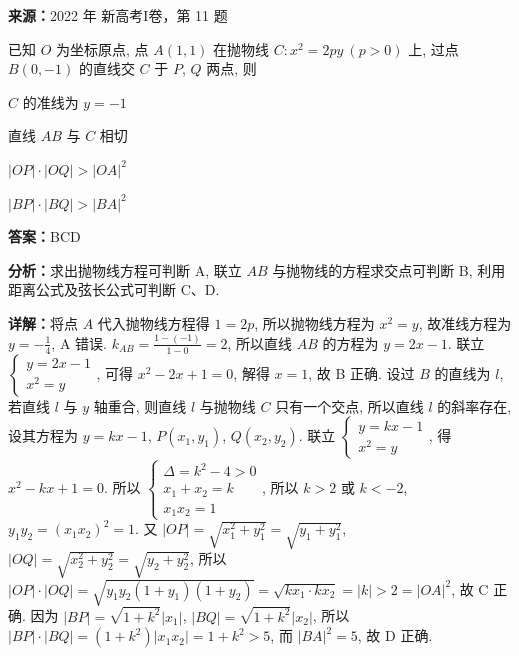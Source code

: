 \begin{question}[points=5]
\textbf{来源：}2022 年 新高考I卷，第 11 题\par
已知 $O$ 为坐标原点, 点 $A(1,1)$ 在抛物线 $C: x^2 = 2py\ (p > 0)$ 上, 过点 $B(0,-1)$ 的直线交 $C$ 于 $P$, $Q$ 两点, 则
\begin{choices}
  \item $C$ 的准线为 $y = -1$
  \item 直线 $AB$ 与 $C$ 相切
  \item $|OP| \cdot |OQ| > |OA|^2$
  \item $|BP| \cdot |BQ| > |BA|^2$
\end{choices}
\begin{solution}
\textbf{答案：}BCD

\textbf{分析：}求出抛物线方程可判断 A, 联立 $AB$ 与抛物线的方程求交点可判断 B, 利用距离公式及弦长公式可判断 C、D.

\textbf{详解：}将点 $A$ 代入抛物线方程得 $1 = 2p$, 所以抛物线方程为 $x^2 = y$, 故准线方程为 $y = -\frac{1}{4}$, A 错误. $k_{AB} = \frac{1 - (-1)}{1 - 0} = 2$, 所以直线 $AB$ 的方程为 $y = 2x - 1$. 联立 $\begin{cases} y = 2x - 1 \\ x^2 = y \end{cases}$, 可得 $x^2 - 2x + 1 = 0$, 解得 $x = 1$, 故 B 正确. 设过 $B$ 的直线为 $l$, 若直线 $l$ 与 $y$ 轴重合, 则直线 $l$ 与抛物线 $C$ 只有一个交点, 所以直线 $l$ 的斜率存在, 设其方程为 $y = kx - 1$, $P(x_1, y_1)$, $Q(x_2, y_2)$. 联立 $\begin{cases} y = kx - 1 \\ x^2 = y \end{cases}$, 得 $x^2 - kx + 1 = 0$. 所以 $\begin{cases} \Delta = k^2 - 4 > 0 \\ x_1 + x_2 = k \\ x_1 x_2 = 1 \end{cases}$, 所以 $k > 2$ 或 $k < -2$, $y_1 y_2 = (x_1 x_2)^2 = 1$. 又 $|OP| = \sqrt{x_1^2 + y_1^2} = \sqrt{y_1 + y_1^2}$, $|OQ| = \sqrt{x_2^2 + y_2^2} = \sqrt{y_2 + y_2^2}$, 所以 $|OP| \cdot |OQ| = \sqrt{y_1 y_2 (1 + y_1)(1 + y_2)} = \sqrt{k x_1 \cdot k x_2} = |k| > 2 = |OA|^2$, 故 C 正确. 因为 $|BP| = \sqrt{1 + k^2} |x_1|$, $|BQ| = \sqrt{1 + k^2} |x_2|$, 所以 $|BP| \cdot |BQ| = (1 + k^2) |x_1 x_2| = 1 + k^2 > 5$, 而 $|BA|^2 = 5$, 故 D 正确.
\end{solution}
\end{question}


